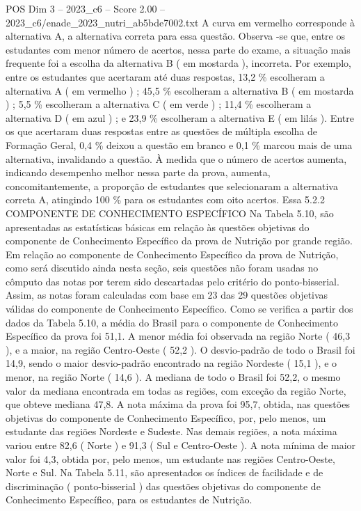 \begin{textsample}{POS Dim 3 – 2023\_c6 – Score 2.00 – 2023\_c6/enade\_2023\_nutri\_ab5bde7002.txt}
A curva em vermelho corresponde à alternativa A, a alternativa correta para essa questão.
Observa -se que, entre os estudantes com menor número de acertos, nessa parte do exame, a situação mais frequente foi a escolha da alternativa B ( em mostarda ), incorreta.
Por exemplo, entre os estudantes que acertaram até duas respostas, 13,2 \% escolheram a alternativa A ( em vermelho ) ; 45,5 \% escolheram a alternativa B ( em mostarda ) ; 5,5 \% escolheram a alternativa C ( em verde ) ; 11,4 \% escolheram a alternativa D ( em azul ) ; e 23,9 \% escolheram a alternativa E ( em lilás ).
Entre os que acertaram duas respostas entre as questões de múltipla escolha de Formação Geral, 0,4 \% deixou a questão em branco e 0,1 \% marcou mais de uma alternativa, invalidando a questão.
À medida que o número de acertos aumenta, indicando desempenho melhor nessa parte da prova, aumenta, concomitantemente, a proporção de estudantes que selecionaram a alternativa correta A, atingindo 100 \% para os estudantes com oito acertos.
Essa 5.2.2 COMPONENTE DE CONHECIMENTO ESPECÍFICO Na Tabela 5.10, são apresentadas as estatísticas básicas em relação às questões objetivas do componente de Conhecimento Específico da prova de Nutrição por grande região.
Em relação ao componente de Conhecimento Específico da prova de Nutrição, como será discutido ainda nesta seção, seis questões não foram usadas no cômputo das notas por terem sido descartadas pelo critério do ponto-bisserial.
Assim, as notas foram calculadas com base em 23 das 29 questões objetivas válidas do componente de Conhecimento Específico.
Como se verifica a partir dos dados da Tabela 5.10, a média do Brasil para o componente de Conhecimento Específico da prova foi 51,1.
A menor média foi observada na região Norte ( 46,3 ), e a maior, na região Centro-Oeste ( 52,2 ).
O desvio-padrão de todo o Brasil foi 14,9, sendo o maior desvio-padrão encontrado na região Nordeste ( 15,1 ), e o menor, na região Norte ( 14,6 ).
A mediana de todo o Brasil foi 52,2, o mesmo valor da mediana encontrada em todas as regiões, com exceção da região Norte, que obteve mediana 47,8.
A nota máxima da prova foi 95,7, obtida, nas questões objetivas do componente de Conhecimento Específico, por, pelo menos, um estudante das regiões Nordeste e Sudeste.
Nas demais regiões, a nota máxima variou entre 82,6 ( Norte ) e 91,3 ( Sul e Centro-Oeste ).
A nota mínima de maior valor foi 4,3, obtida por, pelo menos, um estudante nas regiões Centro-Oeste, Norte e Sul.
Na Tabela 5.11, são apresentados os índices de facilidade e de discriminação ( ponto-bisserial ) das questões objetivas do componente de Conhecimento Específico, para os estudantes de Nutrição.

\end{textsample}
